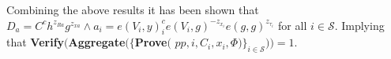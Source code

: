 Combining the above results it has been shown that $D_a  = C^ch^{z_{Ra}}g^{z_{xa}}\wedge a_i = e(V_i,y)^c_i e(V_i,g)^{-z_{x_i}}e(g,g)^{z_{\tau_i}}$ for all $i\in\mathcal{S}$.
Implying that \textbf{Verify}$ ( $\textbf{Aggregate}$ (\{ $\textbf{Prove}$($
$pp,i,C_i,x_i,\Phi)\}_{i\in\mathcal{S}}) )= 1$.



